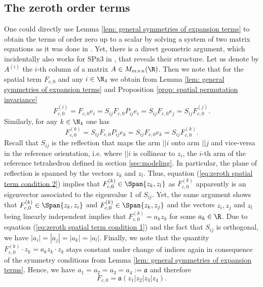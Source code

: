 \subsection{The zeroth order terms} 
One could directly use Lemma \ref{lem: general symmetries of expansion terms} to obtain the terms of order zero up to a scalar by solving a system of two matrix equations as it was done in \cite{Alouges2017}. Yet, there is a direct geometric argument, which incidentally also works for \textsc{SPr3} in \cite{Alouges2017},  that reveals their structure.
Let us denote by $A^{(i)}$ the $i$-th column of a matrix $A \in M_{m \times n}(\R)$. Then we note that for the spatial term $F_{c,0}$ and any $i \in \N_4$ we obtain from Lemma \ref{lem: general symmetries of expansion terms} and Proposition \ref{prop: spatial permutation invariance}
\begin{equation}
\label{eq:zeroth spatial term condition 1}
	F_{c,0}^{(i)} = F_{c,0} e_i = S_{ij} F_{c,0} P_{ij} e_i = S_{ij} F_{c,0} e_j = S_{ij} F_{c,0}^{(j)}.
\end{equation}
Similarly, for any $k \in \N_4$ one has
\begin{equation}
\label{eq:zeroth spatial term condition 2}
F_{c,0}^{(k)} = S_{ij} F_{c,0} P_{ij} e_k = S_{ij} F_{c,0} e_k = S_{ij} F_{c,0}^{(k)}.
\end{equation}
Recall that $S_{ij}$ is the reflection that maps the arm $||i$ onto arm $||j$ and vice-versa in the reference orientation, i.e. where $||i$ is collinear to $z_i$, the $i$-th arm of the reference tetrahedron defined in section \ref{sec:modeling}. In particular, the plane of reflection is spanned by the vectors $z_k$ and $z_l$. Thus, equation (\ref{eq:zeroth spatial term condition 2}) implies that $F_{c,0}^{(k)} \in \Span\{z_k, z_l\}$ as $F_{c,0}^{(k)}$ apparently is an eigenvector associated to the eigenvalue 1 of $S_{ij}$. Yet, the same argument shows that $F_{c,0}^{(k)} \in \Span\{z_k, z_i\}$ and $F_{c,0}^{(k)}  \in \Span\{z_k, z_j\}$ and the vectors $z_i, z_j$ and $z_l$ being linearly independent implies that $F_{c,0}^{(k)} = a_k z_k$ for some $a_k \in \R$. Due to equation (\ref{eq:zeroth spatial term condition 1}) and the fact that $S_{ij}$ is orthogonal, we have $|a_i| = |a_j| = |a_k| = |a_l|$. Finally, we note that the quantity $F^{(k)}_{c, 0} \cdot z_k = a_k z_k \cdot z_k$ stays constant under change of indices again in consequence of the symmetry conditions from Lemma \ref{lem: general symmetries of expansion terms}. Hence, we have $a_1 = a_2 = a_3 =a_4 := \mathfrak{a}$ and therefore
\begin{equation}
\label{eq:position_zeroth_order_term}
	F_{c,0} = \mathfrak{a} (z_1 |z_2| z_3|z_4).
\end{equation}

